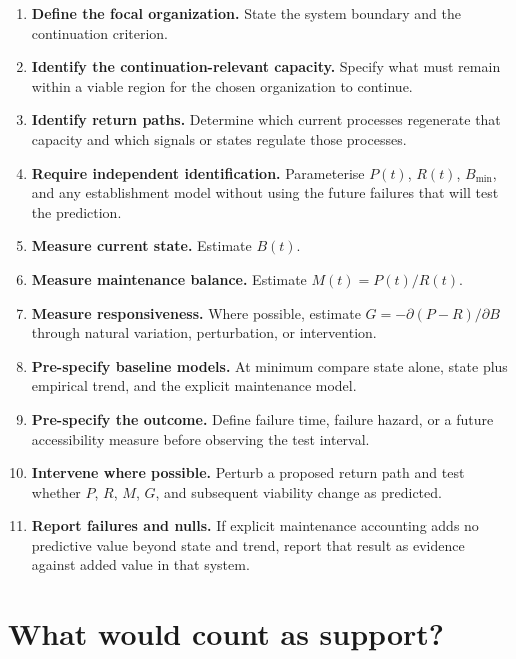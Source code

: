 \documentclass[11pt,a4paper]{article}
\begin{document}
\begin{enumerate}
    \item \textbf{Define the focal organization.} State the system boundary and the continuation criterion.
    \item \textbf{Identify the continuation-relevant capacity.} Specify what must remain within a viable region for the chosen organization to continue.
    \item \textbf{Identify return paths.} Determine which current processes regenerate that capacity and which signals or states regulate those processes.
    \item \textbf{Require independent identification.} Parameterise $P(t)$, $R(t)$, $B_{\min}$, and any establishment model without using the future failures that will test the prediction.
    \item \textbf{Measure current state.} Estimate $B(t)$.
    \item \textbf{Measure maintenance balance.} Estimate $M(t)=P(t)/R(t)$.
    \item \textbf{Measure responsiveness.} Where possible, estimate $G=-\partial(P-R)/\partial B$ through natural variation, perturbation, or intervention.
    \item \textbf{Pre-specify baseline models.} At minimum compare state alone, state plus empirical trend, and the explicit maintenance model.
    \item \textbf{Pre-specify the outcome.} Define failure time, failure hazard, or a future accessibility measure before observing the test interval.
    \item \textbf{Intervene where possible.} Perturb a proposed return path and test whether $P$, $R$, $M$, $G$, and subsequent viability change as predicted.
    \item \textbf{Report failures and nulls.} If explicit maintenance accounting adds no predictive value beyond state and trend, report that result as evidence against added value in that system.
\end{enumerate}

\section{What would count as support?}
\end{document}
